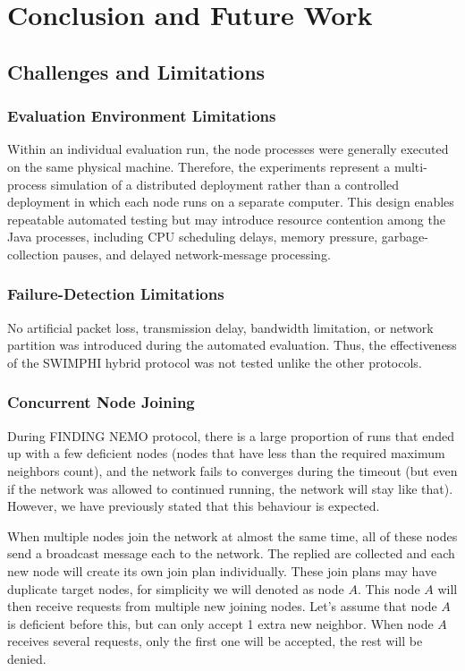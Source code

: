 \section{Conclusion and Future Work}
\label{sec:conclusion}

\subsection{Challenges and Limitations}

\subsubsection{Evaluation Environment Limitations}

Within an individual evaluation run, the node processes were generally executed on the same physical machine.
Therefore, the experiments represent a multi-process simulation of a distributed deployment rather than a controlled
deployment in which each node runs on a separate computer. This design enables repeatable automated testing but may
introduce resource contention among the Java processes, including CPU scheduling delays, memory pressure,
garbage-collection pauses, and delayed network-message processing.

\subsubsection{Failure-Detection Limitations}

No artificial packet loss, transmission delay, bandwidth limitation, or network partition was introduced during the
automated evaluation. Thus, the effectiveness of the SWIMPHI hybrid protocol was not tested unlike the other protocols.

\subsubsection{Concurrent Node Joining}
\label{subsubsec:concurrent-node-joining}

During FINDING NEMO protocol, there is a large proportion of runs that ended up with a few deficient nodes (nodes that
have less than the required maximum neighbors count), and the network fails to converges during the timeout (but even
if the network was allowed to continued running, the network will stay like that). However, we have previously stated
that this behaviour is expected.

When multiple nodes join the network at almost the same time, all of these nodes send a broadcast message each to the
network. The replied are collected and each new node will create its own join plan individually. These join plans may
have duplicate target nodes, for simplicity we will denoted as node $A$. This node $A$ will then receive requests from
multiple new joining nodes. Let's assume that node $A$ is deficient before this, but can only accept 1 extra new
neighbor. When node $A$ receives several requests, only the first one will be accepted, the rest will be denied.

